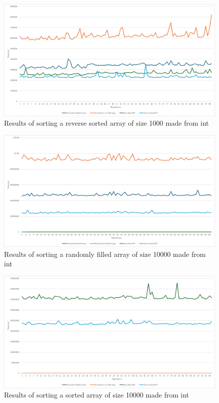 \documentclass{article}
\begin{document}
    \begin{figure}[!h]
        \centering
        \includegraphics[width=0.7\linewidth]{int_1000_reverse_sorted.png}
        \caption{Results of sorting a reverse sorted array of size 1000 made from int}
        \label{fig:int_1000_reverse_sorted}
    \end{figure}
    
    \begin{figure}[!h]
        \centering
        \includegraphics[width=0.7\linewidth]{int_10000_random.png}
        \caption{Results of sorting a randomly filled array of size 10000 made from int}
        \label{fig:int_10000_random}
    \end{figure}
    
    \begin{figure}[!h]
        \centering
        \includegraphics[width=0.7\linewidth]{int_10000_sorted.png}
        \caption{Results of sorting a sorted array of size 10000 made from int}
        \label{fig:int_10000_sorted}
    \end{figure}
    
\end{document}
